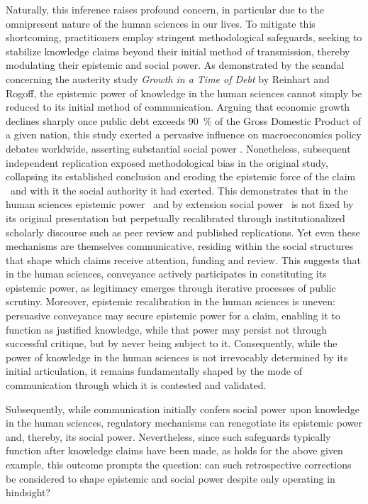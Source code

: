 \documentclass[12pt]{article}
\begin{document}
Naturally, this inference raises profound concern, in particular due to the omnipresent nature of the human sciences in our lives. To mitigate this shortcoming, practitioners employ stringent methodological safeguards, seeking to stabilize knowledge claims beyond their initial method of transmission, thereby modulating their epistemic and social power. As demonstrated by the scandal concerning the austerity study \textit{Growth in a Time of Debt} by Reinhart and Rogoff, the epistemic power of knowledge in the human sciences cannot simply be reduced to its initial method of communication. Arguing that economic growth declines sharply once public debt exceeds \SI{90}{\percent} of the Gross Domestic Product of a given nation, this study exerted a pervasive influence on macroeconomics policy debates worldwide, asserting substantial social power \parencite{10.1093/cje/bet075}. Nonetheless, subsequent independent replication exposed methodological bias in the original study, collapsing its established conclusion and eroding the epistemic force of the claim \textemdash\ and with it the social authority it had exerted. This demonstrates that in the human sciences epistemic power \textemdash\ and by extension social power \textemdash\ is not fixed by its original presentation but perpetually recalibrated through institutionalized scholarly discourse such as peer review and published replications. Yet even these mechanisms are themselves communicative, residing within the social structures that shape which claims receive attention, funding and review. This suggests that in the human sciences, conveyance actively participates in constituting its epistemic power, as legitimacy emerges through iterative processes of public scrutiny. Moreover, epistemic recalibration in the human sciences is uneven: persuasive conveyance may secure epistemic power for a claim, enabling it to function as justified knowledge, while that power may persist not through successful critique, but by never being subject to it. Consequently, while the power of knowledge in the human sciences is not irrevocably determined by its initial articulation, it remains fundamentally shaped by the mode of communication through which it is contested and validated.

Subsequently, while communication initially confers social power upon knowledge in the human sciences, regulatory mechanisms can renegotiate its epistemic power and, thereby, its social power. Nevertheless, since such safeguards typically function after knowledge claims have been made, as holds for the above given example, this outcome prompts the question: can such retrospective corrections be considered to shape epistemic and social power despite only operating in hindsight?
\end{document}
